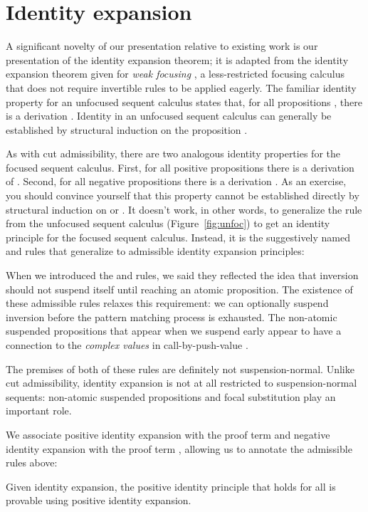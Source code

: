 \documentclass[acmtocl]{robtrans}\pdfoutput=1
\begin{document}
\section{Identity expansion}
\label{sec:expansion}

A significant novelty of our presentation relative to existing work is
our presentation of the identity expansion theorem; it is adapted from
the identity expansion theorem given for {\it weak focusing}
\cite{simmons11weak}, a less-restricted focusing calculus that does
not require invertible rules to be applied eagerly. The familiar
identity property for an unfocused sequent calculus states that, for
all propositions , there is a derivation . Identity in an unfocused sequent calculus can generally be
established by structural induction on the proposition .


As with cut admissibility, there are two analogous identity properties
for the focused sequent calculus. First, for all positive propositions
 there is a derivation of . Second, for
all negative propositions  there is a derivation . As an exercise, you should convince yourself that
this property cannot be established directly by structural induction
on  or . It doesn't work, in other words, to generalize the
 rule from the unfocused sequent calculus
(Figure~\ref{fig:unfoc}) to get an identity principle for the focused
sequent calculus. Instead, it is the suggestively named  and
 rules that generalize to admissible identity expansion
principles:

When we introduced the  and  rules, we said they
reflected the idea that inversion should not suspend itself until
reaching an atomic proposition. The existence of these admissible
rules relaxes this requirement: we can optionally suspend inversion
before the pattern matching process is exhausted. The non-atomic
suspended propositions that appear when we suspend early appear to
have a connection to the {\it complex values} in call-by-push-value
\cite{levy04call}.

The premises of both of these rules are definitely not
suspension-normal. Unlike cut admissibility, identity expansion is not
at all restricted to suspension-normal sequents: non-atomic suspended
propositions and focal substitution play an important role. 

We associate positive identity expansion with the proof term 
and negative identity expansion with the proof term , 
allowing us to annotate the admissible rules above:

Given identity expansion, the positive identity principle that
 holds for all  is provable using
positive identity expansion.
\end{document}
